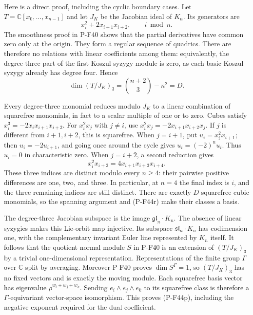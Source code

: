 \documentclass[11pt,a4paper]{article}
\begin{document}
Here is a direct proof, including the cyclic boundary cases.
Let $T=\mathbb C[x_0,\ldots,x_{n-1}]$ and let $J_K$ be the
Jacobian ideal of $K_n$. Its generators are
\[
                 x_i^2+2x_{i+1}x_{i+2},
                         \qquad i\bmod n.
 \tag{P-F44q}
\]
The smoothness proof in P-F40 shows that the partial
derivatives have common zero only at the origin.
They form a regular sequence of quadrics. There are
therefore no relations with linear coefficients among
them: equivalently, the degree-three part of the first
Koszul syzygy module is zero, as each basic Koszul
syzygy already has degree four. Hence
\[
                    \dim(T/J_K)_3
                       =\binom{n+2}{3}-n^2=D.
 \tag{P-F44r}
\]

Every degree-three monomial reduces modulo $J_K$ to a
linear combination of squarefree monomials, in fact to
a scalar multiple of one or to zero. Cubes satisfy
$x_i^3=-2x_ix_{i+1}x_{i+2}$.
For $x_i^2x_j$ with $j\ne i$, use
$x_i^2x_j=-2x_{i+1}x_{i+2}x_j$.
If $j$ is different from $i+1,i+2$, this is squarefree.
When $j=i+1$, put $u_i=x_i^2x_{i+1}$; then
$u_i=-2u_{i+1}$, and going once around the cycle gives
$u_i=(-2)^n u_i$. Thus $u_i=0$ in characteristic zero.
When $j=i+2$, a second reduction gives
\[
                  x_i^2x_{i+2}
                     =4x_{i+1}x_{i+3}x_{i+4}.
 \tag{P-F44s}
\]
These three indices are distinct modulo every $n\ge4$:
their pairwise positive differences are one, two, and
three. In particular, at $n=4$ the final index is $i$,
and the three remaining indices are still distinct.
There are exactly $D$ squarefree cubic monomials, so
the spanning argument and (P-F44r) make their classes
a basis.

The degree-three Jacobian subspace is the image
$\mathfrak{gl}_n\cdot K_n$.
The absence of linear syzygies makes this Lie-orbit
map injective. Its subspace
$\mathfrak{sl}_n\cdot K_n$ has codimension one, with
the complementary invariant Euler line represented
by $K_n$ itself.
It follows that the quotient normal module $S$ in
P-F40 is an extension of $(T/J_K)_3$ by a trivial
one-dimensional representation.
Representations of the finite group $\Gamma$ over
$\mathbb C$ split by averaging.
Moreover P-F40 proves $\dim S^\Gamma=1$, so
$(T/J_K)_3$ has no fixed vectors and is exactly the
moving module.
Each squarefree basis vector has eigenvalue
$\rho^{w_i+w_j+w_k}$. Sending
$e_i\wedge e_j\wedge e_k$ to its squarefree class is
therefore a $\Gamma$-equivariant vector-space
isomorphism. This proves (P-F44p), including the
negative exponent required for the dual coefficient.
\end{document}
